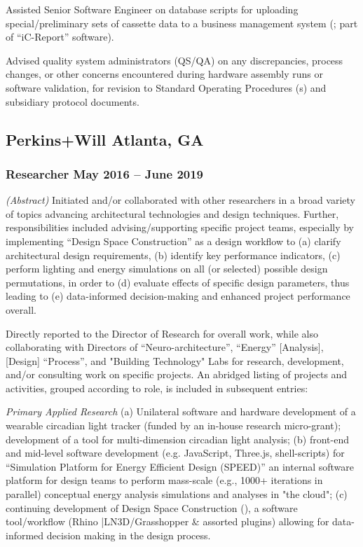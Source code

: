 \documentclass[letterpaper, oneside, 10pt]{article}
\begin{document}
Assisted Senior Software Engineer on  database scripts for uploading
special/preliminary sets of cassette data to a business management system
(; part of ``iC-Report'' software).

Advised quality system administrators (QS/QA) on any discrepancies, process
changes, or other concerns encountered during hardware assembly runs or
software validation, for revision to Standard Operating Procedures (s)
and subsidiary protocol documents.



\subsection*{Perkins+Will\DotSep{0.25em} Atlanta, GA}
\subsubsection*{Researcher\DotSep{0.25em} May 2016 -- June 2019}


\textit{(Abstract)}\DotSep{0.25em} Initiated and/or collaborated with other
researchers in a broad variety of topics advancing architectural technologies
and design techniques. Further, responsibilities included advising/supporting
specific project teams, especially by implementing ``Design Space
Construction'' as a design workflow to (a) clarify architectural design
requirements, (b) identify key performance indicators, (c) perform lighting and
energy simulations on all (or selected) possible design permutations, in order
to (d) evaluate effects of specific design parameters, thus leading to (e)
data-informed decision-making and enhanced project performance overall.

Directly reported to the Director of Research for overall work, while also
collaborating with Directors of ``Neuro-architecture'', ``Energy'' [Analysis],
[Design] ``Process'', and "Building Technology" Labs for research, development,
and/or consulting work on specific projects. An abridged listing of projects
and activities, grouped according to role, is included in subsequent entries:

\textit{Primary Applied Research}\DotSep{0.25em} (a) Unilateral software and
hardware development of a wearable circadian light tracker (funded by an
in-house research micro-grant); development of a tool for multi-dimension
circadian light analysis; (b) front-end and mid-level software development
(e.g. JavaScript, Three.js, shell-scripts) for ``Simulation Platform for Energy
Efficient Design (SPEED)'' an internal software platform for design teams to
perform mass-scale (e.g., 1000+ iterations in parallel) conceptual energy
analysis simulations and analyses in "the cloud"; (c) continuing development of
Design Space Construction (), a software tool/workflow (Rhino
|LN{3D}/Grasshopper \& assorted plugins) allowing for data-informed decision
making in the design process.
\end{document}

